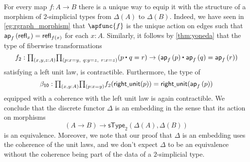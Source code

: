 \begin{eg}
For every map $f:A\to B$ there is a unique way to equip it with the structure of a morphism of $2$-simplicial types from $\Delta(A)$ to $\Delta(B)$. Indeed, we have seen in \cref{eg:rgraph_morphism} that $\apfunc{f}$ is the unique action on edges such that $\mathsf{ap}_{f}\left({\mathsf{refl}_{x}}\right)=\mathsf{refl}_{f(x)}$ for each $x:A$. Similarly, it follows by \cref{thm:yoneda} that the type of fiberwise transformations
\begin{equation*}
f_2 : \prd{x,y,z:A}{p:x=y,\ q:y=z,\ r:x=z} (\ct{p}{q}=r)\to (\ct{\ap{f}{p}}{\ap{f}{q}}=\ap{f}{r})
\end{equation*}
satisfying a left unit law, is contractible. Furthermore, the type of 
\begin{equation*}
\mathsf{\beta_{10}} : \prd{x,y:A}{p:x=y} f_2(\mathsf{right\usc{}unit}(p))= \mathsf{right\usc{}unit}(\ap{f}{p})
\end{equation*}
equipped with a coherence with the left unit law is again contractible. We conclude that the discrete functor $\Delta$ is an embedding in the sense that its action on morphisms
\begin{equation*}
(A\to B)\to \mathsf{sType}_2(\Delta(A),\Delta(B))
\end{equation*}
is an equivalence. Moreover, we note that our proof that $\Delta$ is an embedding uses the coherence of the unit laws, and we don't expect $\Delta$ to be an equivalence without the coherence being part of the data of a $2$-simplicial type.
\end{eg}

